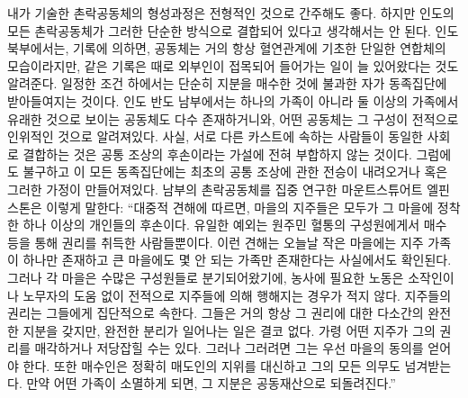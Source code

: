 내가 기술한 촌락공동체의 형성과정은 전형적인 것으로 간주해도 좋다.
하지만
인도의 모든 촌락공동체가
그러한 단순한 방식으로 결합되어 있다고 생각해서는 안 된다.
인도 북부에서는,
기록에 의하면,
공동체는
거의 항상
혈연관계에 기초한 단일한 연합체의 모습이라지만,
같은 기록은
때로 외부인이 접목되어 들어가는 일이 늘 있어왔다는 것도
알려준다.
일정한 조건 하에서는
단순히 지분을 매수한 것에 불과한 자가 동족집단에 받아들여지는 것이다.
인도 반도 남부에서는
하나의 가족이 아니라 둘 이상의 가족에서 유래한 것으로 보이는
공동체도 다수 존재하거니와,
어떤 공동체는 그 구성이 전적으로 인위적인 것으로 알려져있다.
사실,
서로 다른 카스트에 속하는 사람들이
동일한 사회로
결합하는 것은
공통 조상의 후손이라는 가설에 전혀 부합하지 않는 것이다.
그럼에도 불구하고 이 모든 동족집단에는
최초의 공통 조상에 관한 전승이 내려오거나
혹은 그러한 가정이 만들어져있다.
남부의 촌락공동체를 집중 연구한
마운트스튜어트 엘핀스톤은
이렇게 말한다:
``대중적 견해에 따르면,
마을의 지주들은 모두가 그 마을에 정착한 하나 이상의 개인들의 후손이다.
유일한 예외는 원주민 혈통의 구성원에게서 매수 등을 통해
권리를 취득한 사람들뿐이다.
이런 견해는
오늘날
작은 마을에는 지주 가족이 하나만 존재하고
큰 마을에도 몇 안 되는 가족만 존재한다는
사실에서도 확인된다.
그러나 각 마을은 수많은 구성원들로 분기되어왔기에,
농사에 필요한 노동은
소작인이나 노무자의 도움 없이
전적으로 지주들에 의해 행해지는 경우가 적지 않다.
지주들의 권리는 그들에게 집단적으로 속한다.
그들은 거의 항상 그 권리에 대한 다소간의 완전한 지분을 갖지만,
완전한 분리가 일어나는 일은 결코 없다.
가령 어떤 지주가 그의 권리를 매각하거나 저당잡힐 수는 있다.
그러나 그러려면 그는 우선 마을의 동의를 얻어야 한다.
또한 매수인은 정확히 매도인의 지위를 대신하고 그의 모든 의무도 넘겨받는다.
만약 어떤 가족이 소멸하게 되면, 그 지분은 공동재산으로 되돌려진다.''

